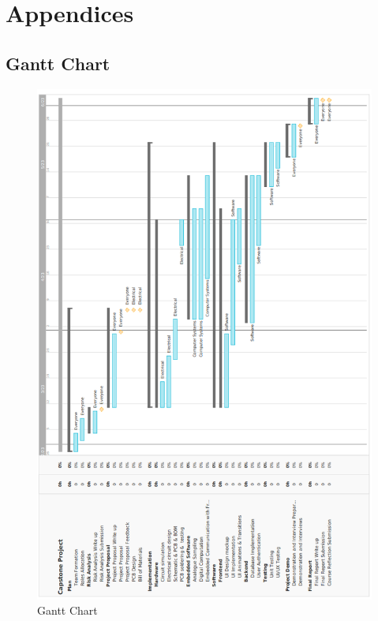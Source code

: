
\graphicspath{ {./parts/} }

\part{Appendices}

\chapter{Gantt Chart}

\begin{figure}[h]
\centering
\includegraphics[width=\textwidth]{proposal/parts/Capstone_Project_Gantt_Chart_Hor.png}
\caption{Gantt Chart}
\end{figure}

